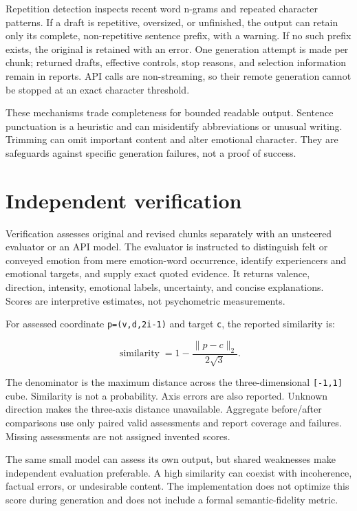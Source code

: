 \documentclass[manuscript,screen,nonacm]{acmart}
\begin{document}
Repetition detection inspects recent word n-grams and repeated character
patterns. If a draft is repetitive, oversized, or unfinished, the output
can retain only its complete, non-repetitive sentence prefix, with a
warning. If no such prefix exists, the original is retained with an
error. One generation attempt is made per chunk; returned drafts,
effective controls, stop reasons, and selection information remain in
reports. API calls are non-streaming, so their remote generation cannot
be stopped at an exact character threshold.

These mechanisms trade completeness for bounded readable output.
Sentence punctuation is a heuristic and can misidentify abbreviations or
unusual writing. Trimming can omit important content and alter emotional
character. They are safeguards against specific generation failures, not
a proof of success.

\section{Independent verification}\label{independent-verification}

Verification assesses original and revised chunks separately with an
unsteered evaluator or an API model. The evaluator is instructed to
distinguish felt or conveyed emotion from mere emotion-word occurrence,
identify experiencers and emotional targets, and supply exact quoted
evidence. It returns valence, direction, intensity, emotional labels,
uncertainty, and concise explanations. Scores are interpretive
estimates, not psychometric measurements.

For assessed coordinate \nolinkurl{p=(v,d,2i-1)} and target \nolinkurl{c}, the
reported similarity is:

\[\operatorname{similarity}=1-\frac{\lVert p-c\rVert_2}{2\sqrt3}.\]

The denominator is the maximum distance across the three-dimensional
\texttt{{[}-1,1{]}} cube. Similarity is not a probability. Axis errors
are also reported. Unknown direction makes the three-axis distance
unavailable. Aggregate before/after comparisons use only paired valid
assessments and report coverage and failures. Missing assessments are
not assigned invented scores.

The same small model can assess its own output, but shared weaknesses
make independent evaluation preferable. A high similarity can coexist
with incoherence, factual errors, or undesirable content. The
implementation does not optimize this score during generation and does
not include a formal semantic-fidelity metric.
\end{document}

